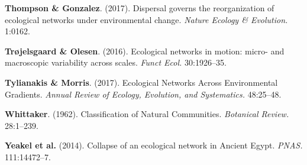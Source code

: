 \leavevmode\hypertarget{ref-ThomGonz17}{}%
\textbf{Thompson \& Gonzalez}. (2017). Dispersal governs the
reorganization of ecological networks under environmental change.
\emph{Nature Ecology \& Evolution.} 1:0162.

\leavevmode\hypertarget{ref-TrojOles16}{}%
\textbf{Trøjelsgaard \& Olesen}. (2016). Ecological networks in motion:
micro- and macroscopic variability across scales. \emph{Funct Ecol.}
30:1926--35.

\leavevmode\hypertarget{ref-TyliMorr17}{}%
\textbf{Tylianakis \& Morris}. (2017). Ecological Networks Across
Environmental Gradients. \emph{Annual Review of Ecology, Evolution, and
Systematics.} 48:25--48.

\leavevmode\hypertarget{ref-Whit62}{}%
\textbf{Whittaker}. (1962). Classification of Natural Communities.
\emph{Botanical Review.} 28:1--239.

\leavevmode\hypertarget{ref-YeakPire14}{}%
\textbf{Yeakel et al.} (2014). Collapse of an ecological network in
Ancient Egypt. \emph{PNAS.} 111:14472--7. 
